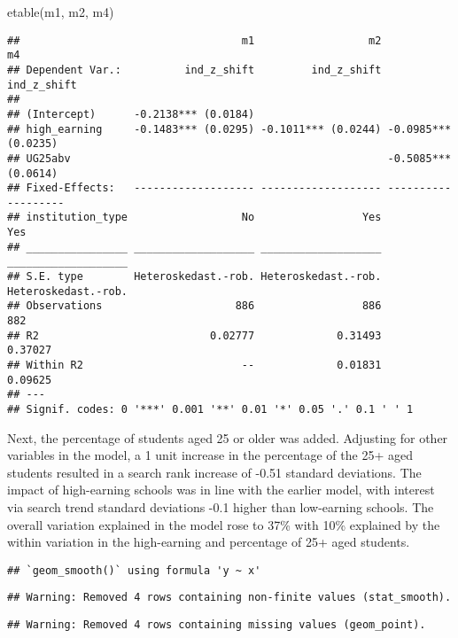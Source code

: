 \documentclass[
]{article}
\newenvironment{Shaded}{\begin{snugshade}}{\end{snugshade}}
\newcommand{\FunctionTok}[1]{\textcolor[rgb]{0.00,0.00,0.00}{#1}}
\newcommand{\NormalTok}[1]{#1}
\begin{document}
\begin{Shaded}
\begin{Highlighting}[]
\FunctionTok{etable}\NormalTok{(m1, m2, m4)}
\end{Highlighting}
\end{Shaded}

\begin{verbatim}
##                                   m1                  m2                  m4
## Dependent Var.:          ind_z_shift         ind_z_shift         ind_z_shift
##                                                                             
## (Intercept)      -0.2138*** (0.0184)                                        
## high_earning     -0.1483*** (0.0295) -0.1011*** (0.0244) -0.0985*** (0.0235)
## UG25abv                                                  -0.5085*** (0.0614)
## Fixed-Effects:   ------------------- ------------------- -------------------
## institution_type                  No                 Yes                 Yes
## ________________ ___________________ ___________________ ___________________
## S.E. type        Heteroskedast.-rob. Heteroskedast.-rob. Heteroskedast.-rob.
## Observations                     886                 886                 882
## R2                           0.02777             0.31493             0.37027
## Within R2                         --             0.01831             0.09625
## ---
## Signif. codes: 0 '***' 0.001 '**' 0.01 '*' 0.05 '.' 0.1 ' ' 1
\end{verbatim}

Next, the percentage of students aged 25 or older was added. Adjusting
for other variables in the model, a 1 unit increase in the percentage of
the 25+ aged students resulted in a search rank increase of -0.51
standard deviations. The impact of high-earning schools was in line with
the earlier model, with interest via search trend standard deviations
-0.1 higher than low-earning schools. The overall variation explained in
the model rose to 37\% with 10\% explained by the within variation in
the high-earning and percentage of 25+ aged students.

\begin{verbatim}
## `geom_smooth()` using formula 'y ~ x'
\end{verbatim}

\begin{verbatim}
## Warning: Removed 4 rows containing non-finite values (stat_smooth).
\end{verbatim}

\begin{verbatim}
## Warning: Removed 4 rows containing missing values (geom_point).
\end{verbatim}
\end{document}
